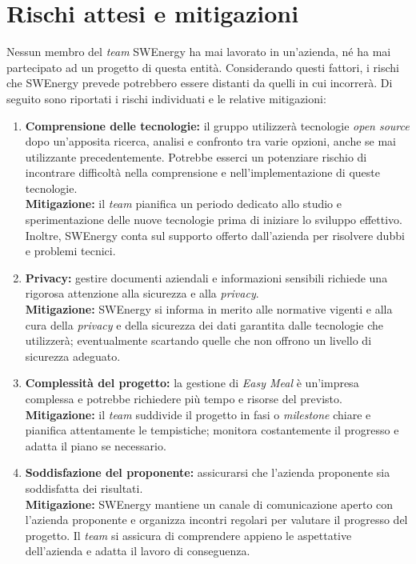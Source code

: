 \section{Rischi attesi e mitigazioni}

Nessun membro del \textit{team} SWEnergy ha mai lavorato in un'azienda, né ha
mai partecipato ad un progetto di questa entità. Considerando questi fattori, i
rischi che SWEnergy prevede potrebbero essere distanti da quelli in cui
incorrerà. 
Di seguito sono riportati i rischi individuati e le relative mitigazioni:
\begin{enumerate}

\item \textbf{Comprensione delle tecnologie:} il gruppo utilizzerà tecnologie 
\textit{open source} dopo un'apposita ricerca, analisi e confronto tra varie opzioni, 
anche se mai utilizzante precedentemente. 
Potrebbe esserci un potenziare rischio di incontrare  difficoltà nella comprensione e 
nell'implementazione di queste tecnologie. \\
\textbf{Mitigazione:} il \textit{team} pianifica un periodo dedicato allo studio e 
sperimentazione delle nuove tecnologie prima di iniziare lo sviluppo effettivo. Inoltre, SWEnergy
conta sul supporto offerto dall'azienda per risolvere dubbi e problemi tecnici.

\item \textbf{Privacy:} gestire documenti aziendali e 
informazioni sensibili richiede una rigorosa attenzione alla sicurezza e alla 
\textit{privacy}. \\
\textbf{Mitigazione:} SWEnergy si informa in merito alle normative vigenti
e alla
cura della \textit{privacy} e della sicurezza dei dati garantita dalle tecnologie che
utilizzerà; eventualmente scartando quelle che non offrono un livello di
sicurezza adeguato.

\item \textbf{Complessità del progetto:} la gestione di \textit{Easy Meal} è
un'impresa complessa e potrebbe richiedere più tempo e risorse del previsto. \\
\textbf{Mitigazione:} il \textit{team} suddivide il progetto in fasi o 
\textit{milestone} chiare e 
pianifica attentamente le tempistiche; monitora costantemente il progresso e
adatta il piano se necessario. 

\item \textbf{Soddisfazione del proponente:} assicurarsi che l'azienda proponente sia 
soddisfatta dei risultati. \\
\textbf{Mitigazione:} SWEnergy mantiene un canale di comunicazione aperto con 
l'azienda 
proponente e organizza incontri regolari per valutare il progresso del progetto. 
Il \textit{team} si assicura di comprendere appieno le aspettative dell'azienda 
e adatta il lavoro di conseguenza.
\end{enumerate}
